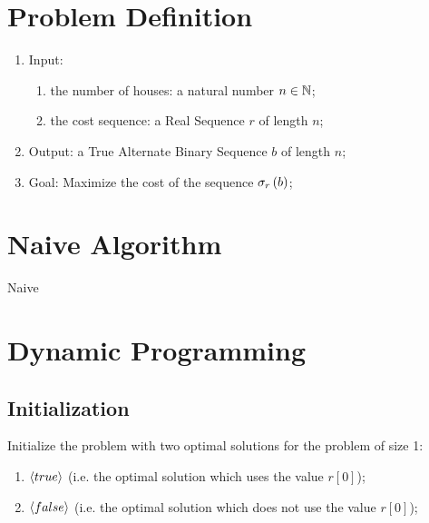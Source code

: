 \section{Problem Definition}

\begin{enumerate}
    \item Input:
    \begin{enumerate}
        \item the number of houses: a natural number $n \in \N$;
        \item the cost sequence: a Real Sequence $r$ of length $n$;
    \end{enumerate}
    \item Output: a True Alternate Binary Sequence $b$ of length $n$;
    \item Goal: Maximize the cost of the sequence $\cost{b}{r}$;
\end{enumerate}

\section{Naive Algorithm}

\begin{algorithm}[H]
    \caption{Naive}
    \label{burglar's-night-out:algorithm:naive}
    \begin{algorithmic}[1]
    \end{algorithmic}
\end{algorithm}

\section{Dynamic Programming}

\subsection{Initialization}

Initialize the problem with two optimal solutions for the problem of size 1:

\begin{enumerate}
    \item $\tuple{true}$  (i.e. the optimal solution which uses the value $r[0]$);
    \item $\tuple{false}$ (i.e. the optimal solution which does not use the value $r[0]$);
\end{enumerate}

